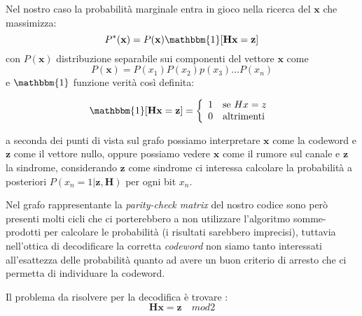 	Nel nostro caso la probabilità marginale entra in gioco nella ricerca del $\textbf{x}$ che massimizza:
\begin{equation} 
	P^*(\textbf{x})=P(\textbf{x})\mathbbm{1}[\textbf{Hx} = \textbf{z}]
\end{equation}
con $P(\textbf{x})$ distribuzione separabile sui componenti del vettore $\textbf{x}$ come
\begin{equation*} P(\textbf{x})=P(x_1)P(x_2)p(x_3)\dots P(x_n) \end{equation*}
e $\mathbbm{1}$ funzione verità così definita: 

		\begin{equation*}
			\mathbbm{1}[\textbf{Hx} = \textbf{z}] =
				\left\{
					\begin{array}{ll}
						1  & \mbox{se } Hx=z \\
						0 & \mbox{altrimenti }
					\end{array}
				\right.
		\end{equation*}

		a seconda dei punti di vista sul grafo possiamo interpretare $\textbf{x}$ come la codeword e $\textbf{z}$ come il vettore nullo, oppure possiamo vedere $\textbf{x}$ come il rumore sul canale e $\textbf{z}$ la sindrome, considerando $\textbf{z}$ come sindrome ci interessa calcolare la probabilità a posteriori $P(x_n = 1 | \textbf{z}, \textbf{H})$ per ogni bit $x_n$. 
		
		Nel grafo rappresentante la \textit{parity-check matrix} del nostro codice sono però presenti molti cicli che ci porterebbero a non utilizzare l'algoritmo somme-prodotti per calcolare le probabilità (i risultati sarebbero imprecisi), tuttavia nell'ottica di decodificare la corretta \textit{codeword} non siamo tanto interessati all'esattezza delle probabilità quanto ad avere un buon criterio di arresto che ci permetta di individuare la codeword. 
		
		Il problema da risolvere per la decodifica è trovare :
	\begin{equation}
		\textbf{Hx} = \textbf{z} \quad mod 2
	\end{equation}	

\newpage

